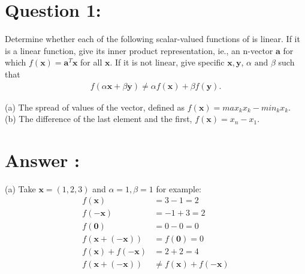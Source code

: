 \documentclass[a4paper,12pt]{article}
\begin{document}
\section*{Question 1:}
Determine whether each of the following scalar-valued functions of  is linear. If it is a linear function, give its inner product representation, ie.,
an n-vector \(\bm{a}\) for which \(f(\bm{x}) = \bm{a}^T\bm{x}\) for all \(\bm{x}\). If it is not linear, give specific \(\bm{x}, \bm{y}\), \(\alpha \text{ and } \beta\) such that
\begin{align*}
    f(\alpha \bm{x} + \beta \bm{y}) \neq \alpha f(\bm{x}) + \beta f(\bm{y}).
\end{align*}

(a) The spread of values of the vector, defined as \(f(\bm{x}) = max_kx_k - min_kx_k \). \\
(b) The difference of the last element and the first, \(f(\bm{x}) = x_n - x_1\). \\

\section*{Answer :}
(a)
Take \(\bm{x} = (1, 2, 3)\) and \(\alpha = 1, \beta = 1\) for example:
\begin{align*}
    f(\bm{x}) &= 3 - 1 = 2 \\
    f(\bm{-x}) &= -1 + 3 = 2 \\
    f(\bm{0}) &= 0 - 0 = 0 \\
    f(\bm{x} + (-\bm{x})) &= f(\bm{0}) = 0 \\
    f(\bm{x}) + f(-\bm{x}) &= 2 + 2 = 4 \\
    f(\bm{x} + (-\bm{x})) &\neq f(\bm{x}) + f(-\bm{x}) \\
\end{align*}
\end{document}
